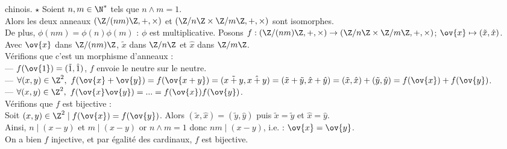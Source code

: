 \documentclass[11pt]{article}
\begin{document}
\begin{thm}{chinois. $\star$}{}
    Soient $n,m\in\N^*$ tels que $n\land m=1$.\\
    Alors les deux anneaux $(\Z/(nm)\Z,+,\times)$ et $(\Z/n\Z\times\Z/m\Z,+,\times)$ sont isomorphes.\\
    De plus, $\phi(nm)=\phi(n)\phi(m)$ : $\phi$ est multiplicative.
    \tcblower
    Posons $f:(\Z/(nm)\Z,+,\times)\to(\Z/n\Z\times\Z/m\Z,+,\times)$; $\ov{x}\mapsto(\tilde{x},\hat{x})$.\\
    Avec $\ov{x}$ dans $\Z/(nm)\Z$, $\tilde{x}$ dans $\Z/n\Z$ et $\hat{x}$ dans $\Z/m\Z$.\\
    Vérifions que c'est un morphisme d'anneaux :\\
    --- $f(\ov{1})=(\tilde{1},\hat{1})$, $f$ envoie le neutre sur le neutre.\\
    --- $\forall (x,y) \in \Z^2, ~ f(\ov{x}+\ov{y})=f(\ov{x+y})=(\tilde{x+y},\hat{x+y})=(\tilde{x}+\tilde{y},\hat{x}+\hat{y})=(\tilde{x},\hat{x})+(\tilde{y},\hat{y})=f(\ov{x})+f(\ov{y})$.\\
    --- $\forall (x,y) \in \Z^2, ~ f(\ov{x}\ov{y})=...=f(\ov{x})f(\ov{y})$.\\
    Vérifions que $f$ est bijective :\\
    Soit $(x,y)\in\Z^2 \mid f(\ov{x})=f(\ov{y})$. Alors $(\tilde{x},\hat{x})=(\tilde{y},\hat{y})$ puis $\tilde{x}=\tilde{y}$ et $\hat{x}=\hat{y}$.\\
    Ainsi, $n \mid (x-y)$ et $m \mid (x-y)$ or $n\land m = 1$ donc $nm \mid (x-y)$, i.e. : $\ov{x}=\ov{y}$.\\
    On a bien $f$ injective, et par égalité des cardinaux, $f$ est bijective.
\end{thm}
\end{document}
